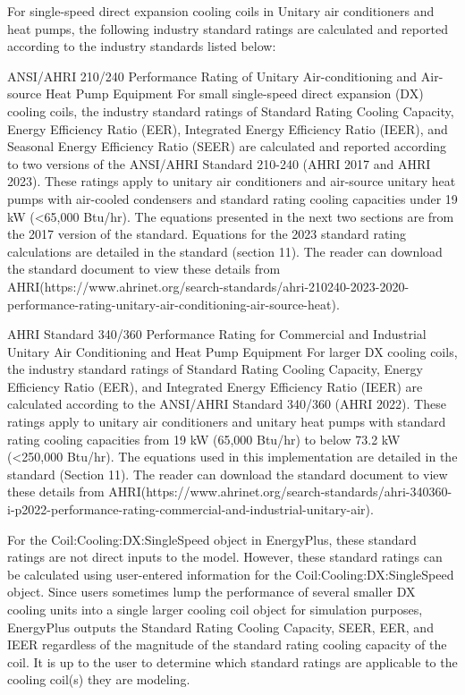 For single-speed direct expansion cooling coils in Unitary air conditioners and heat pumps, the following industry standard ratings are calculated and reported according to the industry standards listed below:

ANSI/AHRI 210/240 Performance Rating of Unitary Air-conditioning and Air-source Heat Pump Equipment
For small single-speed direct expansion (DX) cooling coils, the industry standard ratings of Standard Rating Cooling Capacity, Energy Efficiency Ratio (EER), Integrated Energy Efficiency Ratio (IEER), and Seasonal Energy Efficiency Ratio (SEER) are calculated and reported according to two versions of the ANSI/AHRI Standard 210-240 (AHRI 2017 and AHRI 2023). These ratings apply to unitary air conditioners and air-source unitary heat pumps with air-cooled condensers and standard rating cooling capacities under 19 kW (\textless{}65,000 Btu/hr). The equations presented in the next two sections are from the 2017 version of the standard.  Equations for the 2023 standard rating calculations are detailed in the standard (section 11). The reader can download the standard document to view these details from AHRI(https://www.ahrinet.org/search-standards/ahri-210240-2023-2020-performance-rating-unitary-air-conditioning-air-source-heat).

AHRI Standard 340/360 Performance Rating for Commercial and Industrial Unitary Air Conditioning and Heat Pump Equipment
For larger DX cooling coils, the industry standard ratings of Standard Rating Cooling Capacity, Energy Efficiency Ratio (EER), and Integrated Energy Efficiency Ratio (IEER) are calculated according to the ANSI/AHRI Standard 340/360 (AHRI 2022). These ratings apply to unitary air conditioners and unitary heat pumps with standard rating cooling capacities from 19 kW (65,000 Btu/hr) to below 73.2 kW (\textless{}250,000 Btu/hr). The equations used in this implementation are detailed in the standard (Section 11). The reader can download the standard document to view these details from AHRI(https://www.ahrinet.org/search-standards/ahri-340360-i-p2022-performance-rating-commercial-and-industrial-unitary-air).

For the Coil:Cooling:DX:SingleSpeed object in EnergyPlus, these standard ratings are not direct inputs to the model. However, these standard ratings can be calculated using user-entered information for the Coil:Cooling:DX:SingleSpeed object. Since users sometimes lump the performance of several smaller DX cooling units into a single larger cooling coil object for simulation purposes, EnergyPlus outputs the Standard Rating Cooling Capacity, SEER, EER, and IEER regardless of the magnitude of the standard rating cooling capacity of the coil. It is up to the user to determine which standard ratings are applicable to the cooling coil(s) they are modeling.

